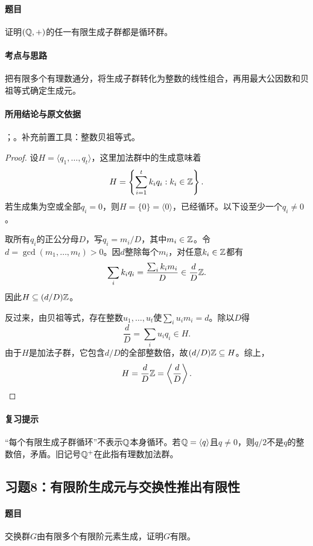 \paragraph{题目}
证明$(\mathbb Q,+)$的任一有限生成子群都是循环群。

\paragraph{考点与思路}
把有限多个有理数通分，将生成子群转化为整数的线性组合，再用最大公因数和贝祖等式确定生成元。

\paragraph{所用结论与原文依据}
；。补充前置工具：整数贝祖等式。


\begin{proof}
设$H=\langle q_1,\ldots,q_t\rangle$，这里加法群中的生成意味着
\[
H=\left\{\sum_{i=1}^t k_iq_i:k_i\in\mathbb Z\right\}.
\]
若生成集为空或全部$q_i=0$，则$H=\{0\}=\langle0\rangle$，已经循环。以下设至少一个$q_i\ne0$。

取所有$q_i$的正公分母$D$，写$q_i=m_i/D$，其中$m_i\in\mathbb Z$。令$d=\gcd(m_1,\ldots,m_t)>0$。因$d$整除每个$m_i$，对任意$k_i\in\mathbb Z$都有
\[
\sum_i k_iq_i=\frac{\sum_i k_im_i}{D}\in\frac dD\mathbb Z.
\]
因此$H\subseteq(d/D)\mathbb Z$。

反过来，由贝祖等式，存在整数$u_1,\ldots,u_t$使$\sum_i u_im_i=d$。除以$D$得
\[
\frac dD=\sum_i u_iq_i\in H.
\]
由于$H$是加法子群，它包含$d/D$的全部整数倍，故$(d/D)\mathbb Z\subseteq H$。综上，
\[
H=\frac dD\mathbb Z=\left\langle\frac dD\right\rangle.
\]
\end{proof}

\paragraph{复习提示}
“每个有限生成子群循环”不表示$\mathbb Q$本身循环。若$\mathbb Q=\langle q\rangle$且$q\ne0$，则$q/2$不是$q$的整数倍，矛盾。旧记号$\mathbb Q^+$在此指有理数加法群。


\subsection{习题8：\texorpdfstring{有限阶生成元与交换性推出有限性}{有限阶生成元与交换性推出有限性}}
\label{ex:2:8}

\paragraph{题目}
交换群$G$由有限多个有限阶元素生成，证明$G$有限。

